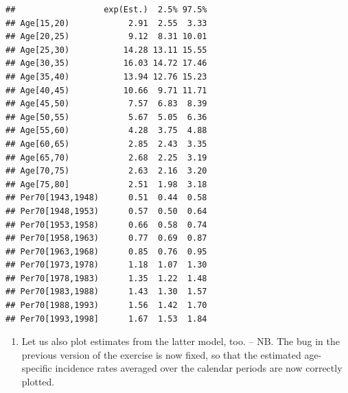 \documentclass[
]{book}
\newenvironment{Shaded}{\begin{snugshade}}{\end{snugshade}}
\newcommand{\AttributeTok}[1]{\textcolor[rgb]{0.13,0.29,0.53}{#1}}
\newcommand{\DecValTok}[1]{\textcolor[rgb]{0.00,0.00,0.81}{#1}}
\newcommand{\FunctionTok}[1]{\textcolor[rgb]{0.13,0.29,0.53}{\textbf{#1}}}
\newcommand{\NormalTok}[1]{#1}
\newcommand{\OtherTok}[1]{\textcolor[rgb]{0.56,0.35,0.01}{#1}}
\newcommand{\SpecialCharTok}[1]{\textcolor[rgb]{0.81,0.36,0.00}{\textbf{#1}}}
\providecommand{\tightlist}{%
  \setlength{\itemsep}{0pt}\setlength{\parskip}{0pt}}
\theoremstyle{definition}
\theoremstyle{definition}
\theoremstyle{definition}
\theoremstyle{definition}
\theoremstyle{remark}
\begin{document}
\begin{Shaded}
\end{Shaded}

\begin{verbatim}
##                  exp(Est.)  2.5% 97.5%
## Age[15,20)            2.91  2.55  3.33
## Age[20,25)            9.12  8.31 10.01
## Age[25,30)           14.28 13.11 15.55
## Age[30,35)           16.03 14.72 17.46
## Age[35,40)           13.94 12.76 15.23
## Age[40,45)           10.66  9.71 11.71
## Age[45,50)            7.57  6.83  8.39
## Age[50,55)            5.67  5.05  6.36
## Age[55,60)            4.28  3.75  4.88
## Age[60,65)            2.85  2.43  3.35
## Age[65,70)            2.68  2.25  3.19
## Age[70,75)            2.63  2.16  3.20
## Age[75,80]            2.51  1.98  3.18
## Per70[1943,1948)      0.51  0.44  0.58
## Per70[1948,1953)      0.57  0.50  0.64
## Per70[1953,1958)      0.66  0.58  0.74
## Per70[1958,1963)      0.77  0.69  0.87
## Per70[1963,1968)      0.85  0.76  0.95
## Per70[1973,1978)      1.18  1.07  1.30
## Per70[1978,1983)      1.35  1.22  1.48
## Per70[1983,1988)      1.43  1.30  1.57
## Per70[1988,1993)      1.56  1.42  1.70
## Per70[1993,1998]      1.67  1.53  1.84
\end{verbatim}

\begin{enumerate}
\def\labelenumi{\arabic{enumi}.}
\setcounter{enumi}{3}
\tightlist
\item
  Let us also plot estimates from the latter model, too. -- NB. The bug
  in the previous version of the exercise is now fixed, so that
  the estimated age-specific incidence rates averaged over the calendar
  periods are now correctly plotted.
\end{enumerate}
\end{document}
